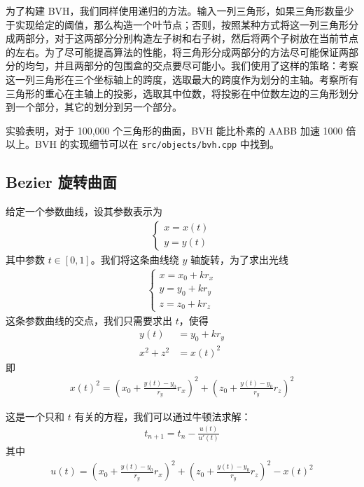 \documentclass[cn]{report}
\let\t\texttt
\begin{document}
    为了构建 BVH，我们同样使用递归的方法。输入一列三角形，如果三角形数量少于实现给定的阈值，那么构造一个叶节点；否则，按照某种方式将这一列三角形分成两部分，对于这两部分分别构造左子树和右子树，然后将两个子树放在当前节点的左右。为了尽可能提高算法的性能，将三角形分成两部分的方法尽可能保证两部分的均匀，并且两部分的包围盒的交点要尽可能小。我们使用了这样的策略：考察这一列三角形在三个坐标轴上的跨度，选取最大的跨度作为划分的主轴。考察所有三角形的重心在主轴上的投影，选取其中位数，将投影在中位数左边的三角形划分到一个部分，其它的划分到另一个部分。

    实验表明，对于 100,000 个三角形的曲面，BVH 能比朴素的 AABB 加速 1000 倍以上。BVH 的实现细节可以在 \t{src/objects/bvh.cpp} 中找到。

    \subsection{Bezier 旋转曲面}

    给定一个参数曲线，设其参数表示为 \begin{align}
        \begin{cases}
            x = x(t) \\
            y = y(t)
        \end{cases}
    \end{align} 其中参数 $t \in [0, 1]$。我们将这条曲线绕 $y$ 轴旋转，为了求出光线 \begin{align}
        \begin{cases}
            x = x_0 + k r_x \\
            y = y_0 + k r_y \\
            z = z_0 + k r_z
        \end{cases}
    \end{align}
    这条参数曲线的交点，我们只需要求出 $t$，使得 \begin{align}
        y(t) &= y_0 + k r_y \\
        x^2 + z^2 &= x(t)^2
    \end{align}
    即 \begin{align}
        x(t)^2 =
        \left(x_0 + \frac{y(t) - y_0}{r_y} r_x\right)^2
        + \left(z_0 + \frac{y(t) - y_0}{r_y} r_z\right)^2
    \end{align}

    这是一个只和 $t$ 有关的方程，我们可以通过牛顿法求解： \begin{align}
        t_{n+1} = t_n - \frac{u(t)}{u'(t)}
    \end{align}
    其中 \begin{align}
        u(t) = \left(x_0 + \frac{y(t) - y_0}{r_y} r_x\right)^2
        + \left(z_0 + \frac{y(t) - y_0}{r_y} r_z\right)^2
        - x(t)^2
    \end{align}
\end{document}
